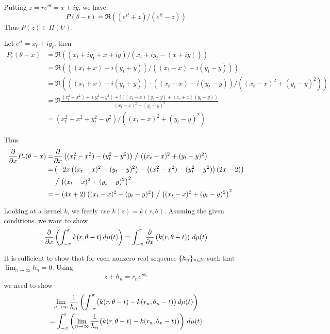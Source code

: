 \begin{enumerate}
Putting \(z = re^{i\theta} = x + iy\), we have:
\begin{equation*}
\renewcommand{\currentprefix}{ex11.4}
P(\theta -t) = \Re\left((e^{it}+z)/(e^{it}-z)\right)
\end{equation*}
Thus \(P(z) \in H(U)\).

Let \(e^{it} = x_t + iy_t\), then
\begin{align*}
 P_r(\theta -x)
&= \Re\left((x_t + iy_t + x+iy)/\left(x_t + iy_t -(x+iy)\right)\right) \\
&= \Re\left(((x_t+x) + i(y_t + y))/\left((x_t-x) + i(y_t - y)\right)\right) \\
&= \Re\left(\left((x_t+x) + i(y_t + y)\right)
           \cdot\left((x_t-x) - i(y_t - y)\right)
         / \left((x_t-x)^2 + (y_t - y)^2\right)\right) \\
&= \Re\frac{(x_t^2 - x^2) + (y_t^2 - y^2)
           + i\left((x_t-x)(y_t + y) + (x_t+x)(y_t - y)\right)}{
             (x_t-x)^2 + (y_t - y)^2} \\
&= (x_t^2 - x^2 + y_t^2 - y^2) / \left((x_t-x)^2 + (y_t - y)^2\right)
\end{align*}

Thus
\begin{align*}
\frac{\partial}{\partial x} P_r(\theta -x)
=& \frac{\partial}{\partial x} \left((x_t^2 - x^2) - (y_t^2 - y^2)\right)
   \bigm/ \left((x_t-x)^2 + (y_t - y)^2\right) \\
=&  \left(-2x \left((x_t-x)^2 + (y_t - y)^2\right)
    - \left((x_t^2 - x^2) - (y_t^2 - y^2)\right)(2x -2)\right)
    \\
 & \bigm/
     \left((x_t-x)^2 + (y_t - y)^2\right)^2 \\
=& - (4x + 2)\left((x_t-x)^2 + (y_t - y)^2\right)
     \bigm/ \left((x_t-x)^2 + (y_t - y)^2\right)^2 \\
\end{align*}
\fi

\iffalse
Looking at a kernel $k$, we freely use \(k(z) = k(r,\theta)\).
Asuming the given conditions, we want to show
\begin{equation} \locallabel{eq:need:lim}
\frac{\partial}{\partial x}\left( \int_{-\pi}^\pi k(r,\theta -t)\,d\mu(t)\right)
= 
\int_{-\pi}^\pi \frac{\partial}{\partial x}\left( k(r,\theta -t)\right)\,d\mu(t)
\end{equation}

It is sufficient to show that for each nonzero real sequence \(\{h_n\}_{n\in\mathbb{N}}\)
such that \mbox{\(\lim_{n\to\infty} h_n = 0\)}.
Using 
\begin{equation*}
z + h_n = r_n e^{i\theta_n}
\end{equation*}
we need to show
\begin{multline} \locallabel{need:limn}
\lim_{n\to\infty}\frac{1}{h_n}
 \left( \int_{-\pi}^\pi 
  \bigl(k(r,\theta -t)-k(r_n, \theta_n-t)\bigr)\,d\mu(t)\right)
 \\
 =
\int_{-\pi}^\pi 
  \left( 
    \lim_{n\to\infty}\frac{1}{h_n}
      \bigl(k(r,\theta -t)-k(r_n, \theta_n-t)\bigr)
  \right)
  \,d\mu(t)
\end{multline}


\end{enumerate}
